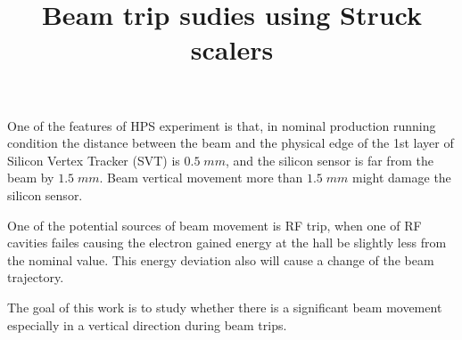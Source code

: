 \documentclass[letterpaper,12pt]{article}
\title{Beam trip sudies using Struck scalers}
\begin{document}
\maketitle
 
 One of the features of HPS experiment is that, in nominal production running condition
 the distance between the beam and the physical edge of the 1st layer of Silicon Vertex Tracker (SVT) is
 $0.5\;mm$, and the silicon sensor is far from the beam by $1.5\;mm$. Beam vertical movement more than $1.5\;mm$ 
 might damage the silicon sensor.
 
 One of the potential sources of beam movement is RF trip, when one of RF cavities failes causing
 the electron gained energy at the hall be slightly less from the nominal value. This energy deviation
 also will cause a change of the beam trajectory.
 
 The goal of this work is to study whether there is a significant beam movement especially in a vertical direction
 during beam trips.
 
 
 
\end{document}

